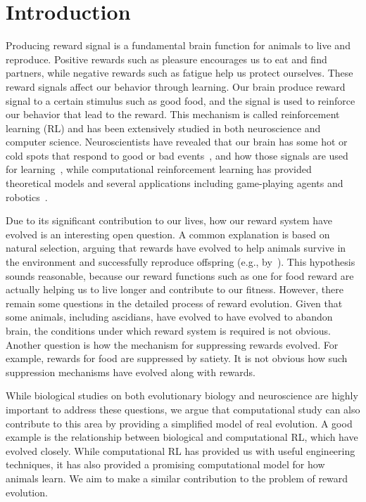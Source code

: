 \section{Introduction}\label{sec:intro}
Producing reward signal is a fundamental brain function for animals to live and reproduce. Positive rewards such as pleasure encourages us to eat and find partners, while negative rewards such as fatigue help us protect ourselves. These reward signals affect our behavior through learning. Our brain produce reward signal to a certain stimulus such as good food, and the signal is used to reinforce our behavior that lead to the reward. This mechanism is called reinforcement learning (RL) and has been extensively studied in both neuroscience and computer science. Neuroscientists have revealed that our brain has some hot or cold spots that respond to good or bad events~\citep{berridgeAffectiveNeurosciencePleasure2008}, and how those signals are used for learning~\citep{schultzNeuronalRewardDecision2015}, while computational reinforcement learning has provided theoretical models and several applications including game-playing agents and robotics~\citep{suttonReinforcementLearningIntroduction2018}.

Due to its significant contribution to our lives, how our reward system have evolved is an interesting open question. A common explanation is based on natural selection, arguing that rewards have evolved to help animals survive in the environment and successfully reproduce offspring (e.g., by~\cite{schultzNeuronalRewardDecision2015}). This hypothesis sounds reasonable, because our reward functions such as one for food reward are actually helping us to live longer and contribute to our fitness. However, there remain some questions in the detailed process of reward evolution. Given that some animals, including ascidians, have evolved to have evolved to abandon brain, the conditions under which reward system is required is not obvious. Another question is how the mechanism for suppressing rewards evolved. For example, rewards for food are suppressed by satiety. It is not obvious how such suppression mechanisms have evolved along with rewards.

While biological studies on both evolutionary biology and neuroscience are highly important to address these questions, we argue that computational study can also contribute to this area by providing a simplified model of real evolution. A good example is the relationship between biological and computational RL, which have evolved closely. While computational RL has provided us with useful engineering techniques, it has also provided a promising computational model for how animals learn. We aim to make a similar contribution to the problem of reward evolution.

